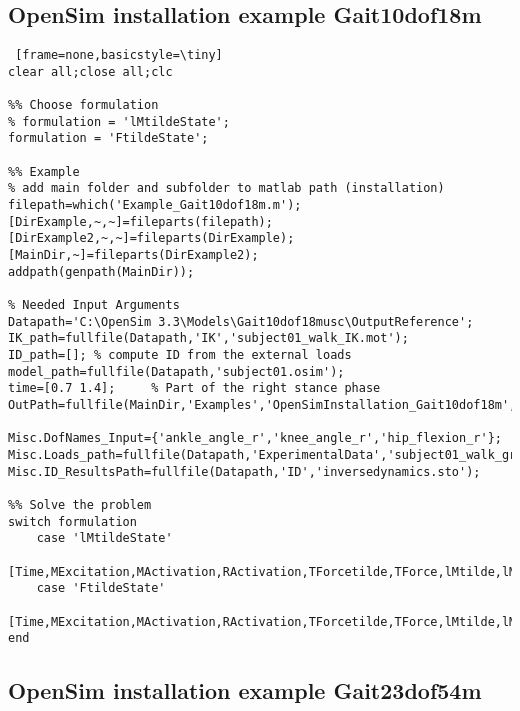 \documentclass[a4paper,oneside,11pt]{article}
\begin{document}
\subsection{OpenSim installation example Gait10dof18m}

\begin{lstlisting} [frame=none,basicstyle=\tiny]
clear all;close all;clc

%% Choose formulation
% formulation = 'lMtildeState';
formulation = 'FtildeState';

%% Example
% add main folder and subfolder to matlab path (installation)
filepath=which('Example_Gait10dof18m.m'); [DirExample,~,~]=fileparts(filepath); [DirExample2,~,~]=fileparts(DirExample); [MainDir,~]=fileparts(DirExample2);
addpath(genpath(MainDir));

% Needed Input Arguments
Datapath='C:\OpenSim 3.3\Models\Gait10dof18musc\OutputReference';
IK_path=fullfile(Datapath,'IK','subject01_walk_IK.mot');
ID_path=[]; % compute ID from the external loads
model_path=fullfile(Datapath,'subject01.osim');
time=[0.7 1.4];     % Part of the right stance phase
OutPath=fullfile(MainDir,'Examples','OpenSimInstallation_Gait10dof18m','Results');

Misc.DofNames_Input={'ankle_angle_r','knee_angle_r','hip_flexion_r'};
Misc.Loads_path=fullfile(Datapath,'ExperimentalData','subject01_walk_grf.xml');
Misc.ID_ResultsPath=fullfile(Datapath,'ID','inversedynamics.sto');

%% Solve the problem
switch formulation
    case 'lMtildeState'
        [Time,MExcitation,MActivation,RActivation,TForcetilde,TForce,lMtilde,lM,MuscleNames,OptInfo,DatStore]=SolveMuscleRedundancy_lMtildeState(model_path,IK_path,ID_path,time,OutPath,Misc);
    case 'FtildeState'   
        [Time,MExcitation,MActivation,RActivation,TForcetilde,TForce,lMtilde,lM,MuscleNames,OptInfo,DatStore]=SolveMuscleRedundancy_FtildeState(model_path,IK_path,ID_path,time,OutPath,Misc);
end

\end{lstlisting}


\subsection{OpenSim installation example Gait23dof54m}
\end{document}
